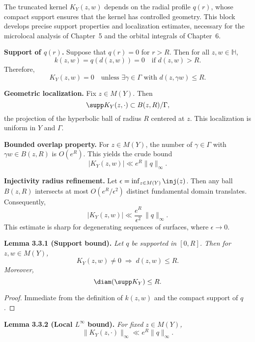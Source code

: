 \noindent


\noindent
The truncated kernel $K_{Y}(z,w)$ depends on the radial profile $q(r)$,
whose compact support ensures that the kernel has controlled geometry.
This block develops precise support properties and localization estimates,
necessary for the microlocal analysis of Chapter~5
and the orbital integrals of Chapter~6.

\medskip

\noindent\textbf{Support of $q(r)$.}
Suppose that $q(r)=0$ for $r>R$.
Then for all $z,w\in\mathbb{H}$,
\[
  k(z,w)=q(d(z,w))=0 \quad \text{if } d(z,w)>R.
\]
Therefore,
\[
  K_{Y}(z,w)=0 \quad \text{unless } \exists\gamma\in\Gamma \text{ with } d(z,\gamma w)\le R.
\]

\medskip

\noindent\textbf{Geometric localization.}
Fix $z\in M(Y)$.
Then
\[
  \supp K_{Y}(z,\cdot) \subset B(z,R)/\Gamma,
\]
the projection of the hyperbolic ball of radius $R$ centered at $z$.
This localization is uniform in $Y$ and $\Gamma$.

\medskip

\noindent\textbf{Bounded overlap property.}
For $z\in M(Y)$,
the number of $\gamma\in\Gamma$ with $\gamma w\in B(z,R)$
is $O(e^{R})$.
This yields the crude bound
\[
  |K_{Y}(z,w)| \ll e^{R}\|q\|_{\infty}.
\]

\medskip

\noindent\textbf{Injectivity radius refinement.}
Let $\epsilon=\inf_{z\in M(Y)}\inj(z)$.
Then any ball $B(z,R)$ intersects at most $O(e^{R}/\epsilon^{2})$
distinct fundamental domain translates.
Consequently,
\[
  |K_{Y}(z,w)| \ll \frac{e^{R}}{\epsilon^{2}}\,\|q\|_{\infty}.
\]
This estimate is sharp for degenerating sequences of surfaces,
where $\epsilon\to 0$.

\medskip

\noindent\textbf{Lemma 3.3.1 (Support bound).}
\emph{Let $q$ be supported in $[0,R]$.
Then for $z,w\in M(Y)$,
\[
  K_{Y}(z,w)\neq 0 \;\Rightarrow\; d(z,w)\le R.
\]
Moreover,
\[
  \diam(\supp K_{Y})\le R.
\]}

\begin{proof}
Immediate from the definition of $k(z,w)$ and the compact support of $q$.
\end{proof}

\medskip

\noindent\textbf{Lemma 3.3.2 (Local $L^{\infty}$ bound).}
\emph{For fixed $z\in M(Y)$,
\[
  \|K_{Y}(z,\cdot)\|_{\infty} \ll e^{R}\|q\|_{\infty}.
\]}

